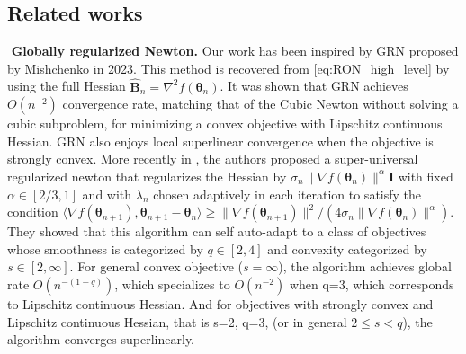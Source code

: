 \documentclass[11pt]{amsart}
\theoremstyle{plain}
\theoremstyle{definition}
\theoremstyle{remark}
\def\I{\mathbf{I}}
\def\B{\mathbf{B}}
\def\param{\boldsymbol{\theta}}
\def\I{\mathbf{I}}
\begin{document}
\subsection{Related works}
${}$
\noindent \textbf{Globally regularized Newton.} Our work has been inspired by GRN proposed by Mishchenko \cite{mishchenko2023regularized} in 2023. This method is recovered from \eqref{eq:RON_high_level} by using the full Hessian $\hat{\B}_{n}=\nabla^{2}f(\param_{n})$. It was shown that GRN achieves $O(n^{-2})$ convergence rate, matching that of the Cubic Newton without solving a cubic subproblem, for minimizing a convex objective with Lipschitz continuous Hessian. GRN also enjoys local superlinear convergence when the objective is strongly convex. { More recently in \cite{doikov2024super}, the authors proposed a super-universal regularized newton that regularizes the Hessian by $\sigma_n\|\nabla f(\param_n)\|^{\alpha}\I$ with fixed $\alpha\in[2/3,1]$ and with $\lambda_n$ chosen adaptively in each iteration to satisfy the condition $\langle\nabla f(\param_{n+1}),\param_{n+1}-\param_{n}\rangle\ge \|\nabla f(\param_{n+1})\|^2/(4\sigma_n\|\nabla f(\param_n)\|^{\alpha}).$ They showed that this algorithm can self auto-adapt to a class of objectives whose smoothness is categorized by $q\in[2,4]$ and convexity categorized by $s\in[2,\infty].$ For general convex objective ($s=\infty$), the algorithm achieves global rate $O(n^{-(1-q)})$, which specializes to $O(n^{-2})$ when q=3, which corresponds to Lipschitz continuous Hessian. And for objectives with strongly convex and Lipschitz continuous Hessian, that is s=2, q=3, (or in general $2\le s<q$), the algorithm converges superlinearly.}
\end{document}
